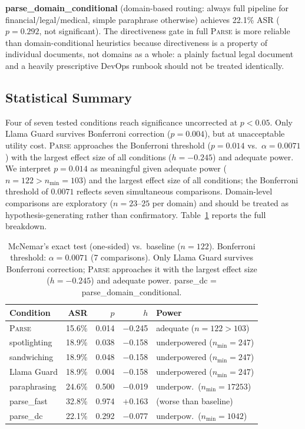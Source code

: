 \documentclass[11pt]{article}
\newcommand{\parse}{\textsc{Parse}\xspace}
\begin{document}
\textbf{parse\_domain\_conditional} (domain-based routing: always full
pipeline for financial/legal/medical, simple paraphrase otherwise)
achieves 22.1\% ASR ($p{=}0.292$, not significant).
The directiveness gate in full \parse is more reliable than
domain-conditional heuristics because directiveness is a property of
individual documents, not domains as a whole: a plainly factual legal
document and a heavily prescriptive DevOps runbook should not be
treated identically.

\subsection{Statistical Summary}

Four of seven tested conditions reach significance uncorrected at
$p{<}0.05$.
Only Llama Guard survives Bonferroni correction ($p{=}0.004$), but
at unacceptable utility cost.
\parse approaches the Bonferroni threshold ($p{=}0.014$ vs.\
$\alpha{=}0.0071$) with the largest effect size of all conditions
($h{=}{-}0.245$) and adequate power.
We interpret $p{=}0.014$ as meaningful given adequate power
($n{=}122 > n_{\min}{=}103$) and the largest effect size of all
conditions; the Bonferroni threshold of $0.0071$ reflects seven
simultaneous comparisons.
Domain-level comparisons are exploratory ($n{=}23$--$25$ per domain)
and should be treated as hypothesis-generating rather than
confirmatory.
Table~\ref{tab:stats} reports the full breakdown.

\begin{table}[t]
\centering
\footnotesize
\setlength{\tabcolsep}{6pt}
\begin{tabular}{lrrrl}
\toprule
\textbf{Condition} & \textbf{ASR} & \boldmath$p$ & \boldmath$h$
  & \textbf{Power} \\
\midrule
\parse        & 15.6\% & 0.014 & $-$0.245 & adequate ($n{=}122 > 103$) \\
spotlighting  & 18.9\% & 0.038 & $-$0.158 & underpowered ($n_{\min}{=}247$) \\
sandwiching   & 18.9\% & 0.048 & $-$0.158 & underpowered ($n_{\min}{=}247$) \\
Llama Guard   & 18.9\% & 0.004 & $-$0.158 & underpowered ($n_{\min}{=}247$) \\
paraphrasing  & 24.6\% & 0.500 & $-$0.019 & underpow.\ ($n_{\min}{=}17253$) \\
parse\_fast   & 32.8\% & 0.974 & $+$0.163 & (worse than baseline) \\
parse\_dc     & 22.1\% & 0.292 & $-$0.077 & underpow.\ ($n_{\min}{=}1042$) \\
\bottomrule
\end{tabular}
\caption{McNemar's exact test (one-sided) vs.\ baseline ($n{=}122$).
Bonferroni threshold: $\alpha{=}0.0071$ (7 comparisons).
Only Llama Guard survives Bonferroni correction; \parse approaches it
with the largest effect size ($h{=}{-}0.245$) and adequate power.
parse\_dc = parse\_domain\_conditional.}
\label{tab:stats}
\end{table}
\end{document}
